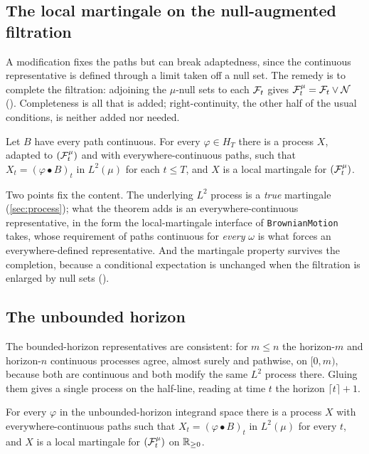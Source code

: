 \documentclass[11pt]{article}
\newcommand{\HT}{H_T}
\newcommand{\bulletB}{\mathbin{\bullet}}
\begin{document}
\subsection{The local martingale on the null-augmented filtration}
A modification fixes the paths but can break adaptedness, since the continuous representative is defined
through a limit taken off a null set. The remedy is to complete the filtration: adjoining the $\mu$-null sets
to each $\mathcal{F}_t$ gives $\mathcal{F}^\mu_t=\mathcal{F}_t\vee\mathcal N$ (). Completeness is all that is added;
right-continuity, the other half of the usual conditions, is neither added nor needed.

\begin{theorem}
Let $B$ have every path continuous. For every $\varphi\in\HT$ there is a process $X$, adapted to
$(\mathcal{F}^\mu_t)$ and with everywhere-continuous paths, such that $X_t=(\varphi\bulletB B)_t$ in $L^2(\mu)$ for each
$t\le T$, and $X$ is a local martingale for $(\mathcal{F}^\mu_t)$.
\end{theorem}

Two points fix the content. The underlying $L^2$ process is a \emph{true} martingale (\cref{sec:process}); what
the theorem adds is an everywhere-continuous representative, in the form the local-martingale interface of
\texttt{BrownianMotion} takes, whose requirement of paths continuous for \emph{every} $\omega$ is what forces an
everywhere-defined representative. And the martingale property survives the completion, because a conditional
expectation is unchanged when the filtration is enlarged by null sets ().

\subsection{The unbounded horizon}
The bounded-horizon representatives are consistent: for $m\le n$ the horizon-$m$ and horizon-$n$ continuous
processes agree, almost surely and pathwise, on $[0,m)$, because both are continuous and both modify the same
$L^2$ process there. Gluing them gives a single process on the half-line, reading at time $t$ the horizon
$\lceil t\rceil+1$.

\begin{theorem}
For every $\varphi$ in the unbounded-horizon integrand space there is a process $X$ with everywhere-continuous
paths such that $X_t=(\varphi\bulletB B)_t$ in $L^2(\mu)$ for every $t$, and $X$ is a local martingale for
$(\mathcal{F}^\mu_t)$ on $\mathbb{R}_{\ge0}$.
\end{theorem}
\end{document}
